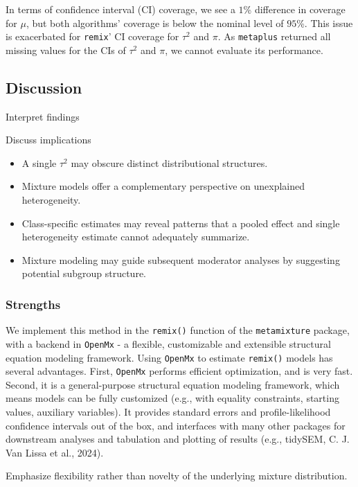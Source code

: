 \documentclass[
  english,
  man, noextraspace,floatsintext]{apa6}
\begin{document}
In terms of confidence interval (CI) coverage, we see a \(1\)\% difference in coverage for \(\mu\), but both algorithms' coverage is below the nominal level of \(95\)\%.
This issue is exacerbated for \texttt{remix}' CI coverage for \(\tau^2\) and \(\pi\).
As \texttt{metaplus} returned all missing values for the CIs of \(\tau^2\) and \(\pi\), we cannot evaluate its performance.

\subsection{Discussion}\label{discussion}

Interpret findings

Discuss implications

\begin{itemize}
\item
  A single \(\tau^2\) may obscure distinct distributional structures.
\item
  Mixture models offer a complementary perspective on unexplained heterogeneity.
\item
  Class-specific estimates may reveal patterns that a pooled effect and single heterogeneity estimate cannot adequately summarize.
\item
  Mixture modeling may guide subsequent moderator analyses by suggesting potential subgroup structure.
\end{itemize}

\subsubsection{Strengths}\label{strengths}

We implement this method in the \texttt{remix()} function of the \texttt{metamixture} package, with a backend in \texttt{OpenMx} - a flexible, customizable and extensible structural equation modeling framework.
Using \texttt{OpenMx} to estimate \texttt{remix()} models has several advantages.
First, \texttt{OpenMx} performs efficient optimization, and is very fast.
Second, it is a general-purpose structural equation modeling framework,
which means models can be fully customized (e.g., with equality constraints, starting values, auxiliary variables).
It provides standard errors and profile-likelihood confidence intervals out of the box,
and interfaces with many other packages for downstream analyses and tabulation and plotting of results (e.g., tidySEM, C. J. Van Lissa et al., 2024).

Emphasize flexibility rather than novelty of the underlying mixture distribution.
\end{document}
